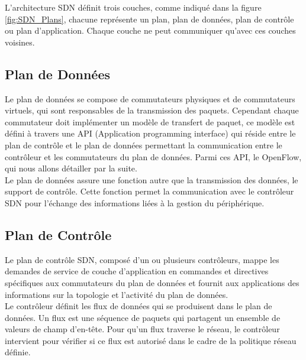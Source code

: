 L’architecture SDN définit trois couches,  comme indiqué dans la figure \ref{fig:SDN_Plans}, chacune représente un plan, plan de données, plan de contrôle ou plan d’application. Chaque couche ne peut communiquer qu’avec ces couches voisines. 

\subsection{Plan de Données}
Le plan de données se compose de commutateurs physiques et de commutateurs virtuels, qui sont responsables de la transmission des paquets. Cependant chaque commutateur doit implémenter un modèle de transfert de paquet, ce modèle est défini à travers une API (Application programming interface) qui réside entre le plan de contrôle et le plan de données permettant la communication entre le contrôleur et les commutateurs du plan de données. Parmi ces API, le OpenFlow, qui nous allons détailler par la suite.\\

\noindent Le plan de données assure une fonction autre que la transmission des données, le support de contrôle. Cette fonction permet la communication avec le contrôleur SDN pour l’échange des informations liées à la gestion du périphérique.  

\subsection{Plan de Contrôle}
Le plan de contrôle SDN, composé d’un ou plusieurs contrôleurs, mappe les demandes de service de couche d’application en commandes et directives spécifiques aux commutateurs du plan de données et fournit aux applications des informations sur la topologie et l’activité du plan de données.\\

\noindent Le contrôleur définit les flux de données qui se produisent dans le plan de données. Un flux est une séquence de paquets qui partagent un ensemble de valeurs de champ d'en-tête. Pour qu’un flux traverse le réseau, le contrôleur intervient pour vérifier si ce flux est autorisé dans le cadre de la politique réseau définie.\\

